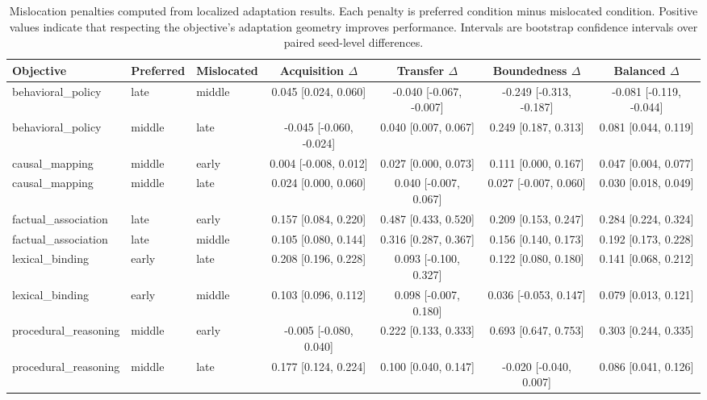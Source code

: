 \begin{table}[t]
\centering
\scriptsize
\setlength{\tabcolsep}{3pt}
\begin{tabular}{lllcccc}
\toprule
Objective & Preferred & Mislocated & Acquisition $\Delta$ & Transfer $\Delta$ & Boundedness $\Delta$ & Balanced $\Delta$ \\
\midrule
behavioral\_policy & late & middle & 0.045 [0.024, 0.060] & -0.040 [-0.067, -0.007] & -0.249 [-0.313, -0.187] & -0.081 [-0.119, -0.044] \\
behavioral\_policy & middle & late & -0.045 [-0.060, -0.024] & 0.040 [0.007, 0.067] & 0.249 [0.187, 0.313] & 0.081 [0.044, 0.119] \\
causal\_mapping & middle & early & 0.004 [-0.008, 0.012] & 0.027 [0.000, 0.073] & 0.111 [0.000, 0.167] & 0.047 [0.004, 0.077] \\
causal\_mapping & middle & late & 0.024 [0.000, 0.060] & 0.040 [-0.007, 0.067] & 0.027 [-0.007, 0.060] & 0.030 [0.018, 0.049] \\
factual\_association & late & early & 0.157 [0.084, 0.220] & 0.487 [0.433, 0.520] & 0.209 [0.153, 0.247] & 0.284 [0.224, 0.324] \\
factual\_association & late & middle & 0.105 [0.080, 0.144] & 0.316 [0.287, 0.367] & 0.156 [0.140, 0.173] & 0.192 [0.173, 0.228] \\
lexical\_binding & early & late & 0.208 [0.196, 0.228] & 0.093 [-0.100, 0.327] & 0.122 [0.080, 0.180] & 0.141 [0.068, 0.212] \\
lexical\_binding & early & middle & 0.103 [0.096, 0.112] & 0.098 [-0.007, 0.180] & 0.036 [-0.053, 0.147] & 0.079 [0.013, 0.121] \\
procedural\_reasoning & middle & early & -0.005 [-0.080, 0.040] & 0.222 [0.133, 0.333] & 0.693 [0.647, 0.753] & 0.303 [0.244, 0.335] \\
procedural\_reasoning & middle & late & 0.177 [0.124, 0.224] & 0.100 [0.040, 0.147] & -0.020 [-0.040, 0.007] & 0.086 [0.041, 0.126] \\
\bottomrule
\end{tabular}
\caption{Mislocation penalties computed from localized adaptation results. Each penalty is preferred condition minus mislocated condition. Positive values indicate that respecting the objective's adaptation geometry improves performance. Intervals are bootstrap confidence intervals over paired seed-level differences.}
\label{tab:mislocation-penalties}
\end{table}
